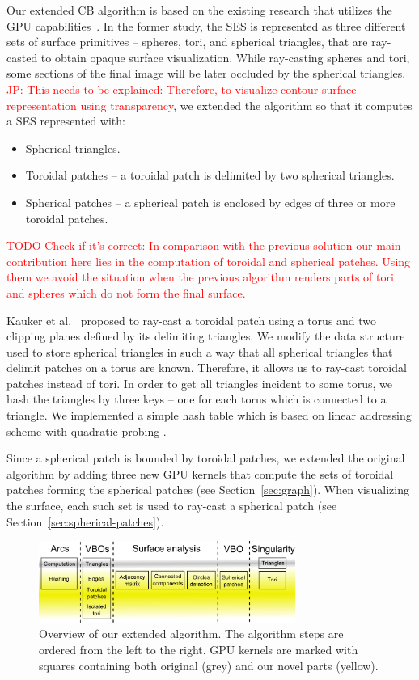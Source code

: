 Our extended CB algorithm is based on the existing research that utilizes the GPU capabilities~\cite{krone2011parallel}.
In the former study, the SES is represented as three different sets of surface primitives -- spheres, tori, and spherical triangles, that are ray-casted to obtain opaque surface visualization. 
While ray-casting spheres and tori, some sections of the final image will be later occluded by the spherical triangles.
\textcolor{red}{JP: This needs to be explained: Therefore, to visualize contour surface representation using transparency}, we extended the algorithm so that it computes a SES represented with:
\begin{itemize}
	\item Spherical triangles.
  \item Toroidal patches -- a toroidal patch is delimited by two spherical triangles.
	\item Spherical patches -- a spherical patch is enclosed by edges of three or more toroidal patches.
\end{itemize}

\textcolor{red}{TODO Check if it's correct: In comparison with the previous solution our main contribution here lies in the computation of toroidal and spherical patches.
Using them we avoid the situation when the previous algorithm renders parts of tori and spheres which do not form the final surface.}

Kauker et al.~\cite{kauker2013rendering} proposed to ray-cast a toroidal patch using a torus and two clipping planes defined by its delimiting triangles.
We modify the data structure used to store spherical triangles in such a way that all spherical triangles that delimit patches on a torus are known. Therefore, it allows us to ray-cast toroidal patches instead of tori.
In order to get all triangles incident to some torus, we hash the triangles by three keys -- one for each torus which is connected to a triangle.
We implemented a simple hash table which is based on linear addressing scheme with quadratic probing \cite{alcantara2011efficient}.

Since a spherical patch is bounded by toroidal patches, we extended the original algorithm by adding three new GPU kernels that compute the sets of toroidal patches forming the spherical patches (see Section~\ref{sec:graph}).
When visualizing the surface, each such set is used to ray-cast a spherical patch (see Section~\ref{sec:spherical-patches}).

\begin{figure}[htb]
  \centering
  \includegraphics[width=3.3in]{image/kernels.png}
  \caption{Overview of our extended algorithm.
	The algorithm steps are ordered from the left to the right.
	GPU kernels are marked with squares containing both original (grey) and our novel parts (yellow).}
	\label{fig:kernels}
\end{figure}

